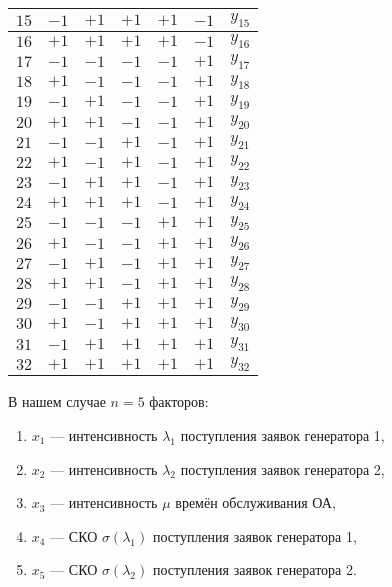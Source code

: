 \documentclass[a4paper, 14pt]{extreport}
\begin{document}
\begin{MainPart}
\begin{table}[hbt!]
\begin{tabular}{|c|c|c|c|c|c|c|}
		$15$    & $-1$  & $+1$  & $+1$  & $+1$  & $-1$  & $y_{15}$ \\ \hline
		$16$    & $+1$  & $+1$  & $+1$  & $+1$  & $-1$  & $y_{16}$ \\ \hline
		$17$    & $-1$  & $-1$  & $-1$  & $-1$  & $+1$  & $y_{17}$ \\ \hline
		$18$    & $+1$  & $-1$  & $-1$  & $-1$  & $+1$  & $y_{18}$ \\ \hline
		$19$    & $-1$  & $+1$  & $-1$  & $-1$  & $+1$  & $y_{19}$ \\ \hline
		$20$    & $+1$  & $+1$  & $-1$  & $-1$  & $+1$  & $y_{20}$ \\ \hline
		$21$    & $-1$  & $-1$  & $+1$  & $-1$  & $+1$  & $y_{21}$ \\ \hline
		$22$    & $+1$  & $-1$  & $+1$  & $-1$  & $+1$  & $y_{22}$ \\ \hline
		$23$    & $-1$  & $+1$  & $+1$  & $-1$  & $+1$  & $y_{23}$ \\ \hline
		$24$    & $+1$  & $+1$  & $+1$  & $-1$  & $+1$  & $y_{24}$ \\ \hline
		$25$    & $-1$  & $-1$  & $-1$  & $+1$  & $+1$  & $y_{25}$ \\ \hline
		$26$    & $+1$  & $-1$  & $-1$  & $+1$  & $+1$  & $y_{26}$ \\ \hline
		$27$    & $-1$  & $+1$  & $-1$  & $+1$  & $+1$  & $y_{27}$ \\ \hline
		$28$    & $+1$  & $+1$  & $-1$  & $+1$  & $+1$  & $y_{28}$ \\ \hline
		$29$    & $-1$  & $-1$  & $+1$  & $+1$  & $+1$  & $y_{29}$ \\ \hline
		$30$    & $+1$  & $-1$  & $+1$  & $+1$  & $+1$  & $y_{30}$ \\ \hline
		$31$    & $-1$  & $+1$  & $+1$  & $+1$  & $+1$  & $y_{31}$ \\ \hline
		$32$    & $+1$  & $+1$  & $+1$  & $+1$  & $+1$  & $y_{32}$ \\ \hline
	\end{tabular}
\end{table}

В нашем случае $n = 5$ факторов:
\begin{enumerate}
	\item $x_1$ — интенсивность $\lambda_1$ поступления заявок генератора 1,
	\item $x_2$ — интенсивность $\lambda_2$ поступления заявок генератора 2,
	\item $x_3$ — интенсивность $\mu$ времён обслуживания ОА,
	\item $x_4$ — СКО $\sigma(\lambda_1)$ поступления заявок генератора 1,
	\item $x_5$ — СКО $\sigma(\lambda_2)$ поступления заявок генератора 2.
\end{enumerate}


\end{MainPart}
\end{document}
